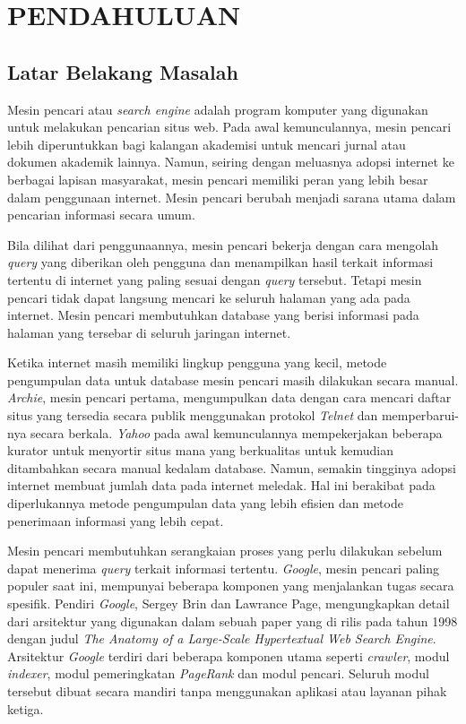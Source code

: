 
\chapter{PENDAHULUAN}

\section{Latar Belakang Masalah}

Mesin pencari atau \emph{search engine} adalah program komputer yang digunakan 
untuk melakukan pencarian situs web. Pada awal kemunculannya, mesin pencari
lebih diperuntukkan bagi kalangan akademisi untuk mencari jurnal atau dokumen
akademik lainnya. Namun, seiring dengan meluasnya adopsi internet ke berbagai
lapisan masyarakat, mesin pencari memiliki peran yang lebih besar dalam
penggunaan internet. Mesin pencari berubah menjadi sarana utama dalam pencarian
informasi secara umum.

Bila dilihat dari penggunaannya, mesin pencari bekerja dengan cara mengolah
\emph{query} yang diberikan oleh pengguna dan menampilkan hasil terkait
informasi tertentu di internet yang paling sesuai dengan \emph{query} tersebut.
Tetapi mesin pencari tidak dapat langsung mencari ke seluruh halaman yang ada
pada internet. Mesin pencari membutuhkan database yang berisi informasi pada
halaman yang tersebar di seluruh jaringan internet. 

Ketika internet masih memiliki lingkup pengguna yang kecil, metode pengumpulan
data untuk database mesin pencari masih dilakukan secara manual. \emph{Archie}, mesin
pencari pertama, mengumpulkan data dengan cara mencari daftar situs yang
tersedia secara publik menggunakan protokol \emph{Telnet} dan memperbarui-nya
secara berkala. \emph{Yahoo} pada awal kemunculannya mempekerjakan beberapa
kurator untuk menyortir situs mana yang berkualitas untuk kemudian ditambahkan
secara manual kedalam database. Namun, semakin tingginya adopsi internet membuat
jumlah data pada internet meledak. Hal ini berakibat pada diperlukannya metode
pengumpulan data yang lebih efisien dan metode penerimaan informasi yang lebih
cepat.

Mesin pencari membutuhkan serangkaian proses yang perlu dilakukan sebelum dapat
menerima \emph{query} terkait informasi tertentu. \emph{Google}, mesin pencari
paling populer saat ini, mempunyai beberapa komponen yang menjalankan tugas
secara spesifik. Pendiri \emph{Google}, Sergey Brin dan Lawrance Page,
mengungkapkan detail dari arsitektur yang digunakan dalam sebuah paper yang di
rilis pada tahun 1998 dengan judul
\textit{The Anatomy of a Large-Scale Hypertextual Web Search Engine}. Arsitektur
\emph{Google} terdiri dari beberapa komponen utama seperti \emph{crawler},
modul \emph{indexer}, modul pemeringkatan \emph{PageRank} dan modul pencari.
Seluruh modul tersebut dibuat secara mandiri tanpa menggunakan aplikasi atau
layanan pihak ketiga.

